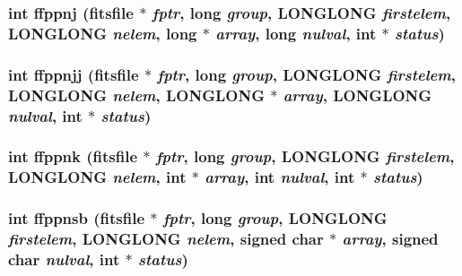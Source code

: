\subsubsection{\setlength{\rightskip}{0pt plus 5cm}int ffppnj (\bf{fitsfile} $\ast$ {\em fptr}, long {\em group}, \bf{LONGLONG} {\em firstelem}, \bf{LONGLONG} {\em nelem}, long $\ast$ {\em array}, long {\em nulval}, int $\ast$ {\em status})}\label{test_2roimasker_2fitsio_8h_4a7b775c21b67c8744fbd23f9a3c1789}


\subsubsection{\setlength{\rightskip}{0pt plus 5cm}int ffppnjj (\bf{fitsfile} $\ast$ {\em fptr}, long {\em group}, \bf{LONGLONG} {\em firstelem}, \bf{LONGLONG} {\em nelem}, \bf{LONGLONG} $\ast$ {\em array}, \bf{LONGLONG} {\em nulval}, int $\ast$ {\em status})}\label{test_2roimasker_2fitsio_8h_76ad1e16557d84ed3f528848a243db06}


\subsubsection{\setlength{\rightskip}{0pt plus 5cm}int ffppnk (\bf{fitsfile} $\ast$ {\em fptr}, long {\em group}, \bf{LONGLONG} {\em firstelem}, \bf{LONGLONG} {\em nelem}, int $\ast$ {\em array}, int {\em nulval}, int $\ast$ {\em status})}\label{test_2roimasker_2fitsio_8h_eb3b195b63cb8a9b04d47cf6b8fda66a}


\subsubsection{\setlength{\rightskip}{0pt plus 5cm}int ffppnsb (\bf{fitsfile} $\ast$ {\em fptr}, long {\em group}, \bf{LONGLONG} {\em firstelem}, \bf{LONGLONG} {\em nelem}, signed char $\ast$ {\em array}, signed char {\em nulval}, int $\ast$ {\em status})}\label{test_2roimasker_2fitsio_8h_d663bf4dbce34e909c2eb15c2da1a376}


